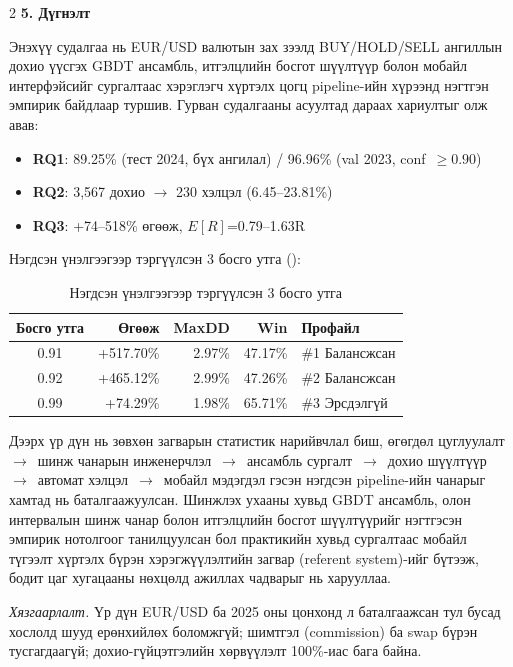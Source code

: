 \begin{multicols*}{2}
\noindent\textbf{5. Дүгнэлт}

Энэхүү судалгаа нь EUR/USD валютын зах зээлд BUY/HOLD/SELL ангиллын дохио үүсгэх GBDT ансамбль, итгэлцлийн босгот шүүлтүүр болон мобайл интерфэйсийг сургалтаас хэрэглэгч хүртэлх цогц pipeline-ийн хүрээнд нэгтгэн эмпирик байдлаар туршив. Гурван судалгааны асуултад дараах хариултыг олж авав:

\begin{itemize}\setlength\itemsep{0pt}\small
    \item \textbf{RQ1}: 89.25\% (тест 2024, бүх ангилал) / 96.96\% (val 2023, conf~$\geq 0.90$)
    \item \textbf{RQ2}: 3{,}567 дохио $\to$ 230 хэлцэл (6.45--23.81\%)
    \item \textbf{RQ3}: +74--518\% өгөөж, $E[R]$=0.79--1.63R
\end{itemize}

Нэгдсэн үнэлгээгээр тэргүүлсэн 3 босго утга ():

\begin{table}[H]
\centering
\caption{Нэгдсэн үнэлгээгээр тэргүүлсэн 3 босго утга}
\label{tab:tov_rq3_summary}
\scriptsize
\renewcommand{\arraystretch}{1.12}
\setlength{\tabcolsep}{2.5pt}
\begin{tabular}{|c|r|r|r|l|}
\hline
Босго утга & Өгөөж & MaxDD & Win & Профайл \\ \hline
0.91 & +517.70\% & 2.97\% & 47.17\% & \#1 Балансжсан \\ \hline
0.92 & +465.12\% & 2.99\% & 47.26\% & \#2 Балансжсан \\ \hline
0.99 & +74.29\%  & 1.98\% & 65.71\% & \#3 Эрсдэлгүй \\ \hline
\end{tabular}
\end{table}

Дээрх үр дүн нь зөвхөн загварын статистик нарийвчлал биш, өгөгдөл цуглуулалт~$\to$~шинж чанарын инженерчлэл~$\to$~ансамбль сургалт~$\to$~дохио шүүлтүүр~$\to$~автомат хэлцэл~$\to$~мобайл мэдэгдэл гэсэн нэгдсэн pipeline-ийн чанарыг хамтад нь баталгаажуулсан. Шинжлэх ухааны хувьд GBDT ансамбль, олон интервалын шинж чанар болон итгэлцлийн босгот шүүлтүүрийг нэгтгэсэн эмпирик нотолгоог танилцуулсан бол практикийн хувьд сургалтаас мобайл түгээлт хүртэлх бүрэн хэрэгжүүлэлтийн загвар (referent system)-ийг бүтээж, бодит цаг хугацааны нөхцөлд ажиллах чадварыг нь харууллаа.

\emph{Хязгаарлалт.} Үр дүн EUR/USD ба 2025 оны цонхонд л баталгаажсан тул бусад хослолд шууд ерөнхийлөх боломжгүй; шимтгэл (commission) ба swap бүрэн тусгагдаагүй; дохио-гүйцэтгэлийн хөрвүүлэлт 100\%-иас бага байна.


\end{multicols*}
